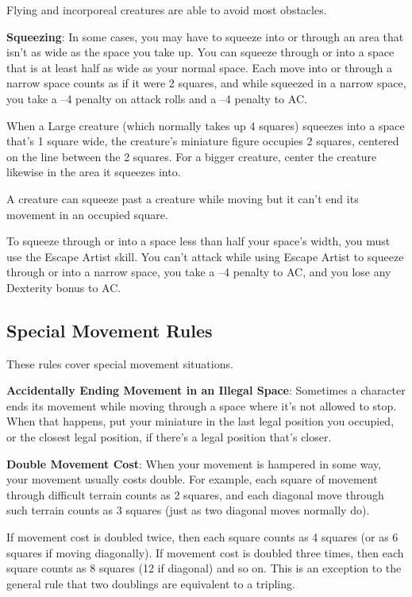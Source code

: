Flying and incorporeal creatures are able to avoid most obstacles.
				
\textbf{Squeezing}: In some cases, you may have to squeeze into or through an area that isn't as wide as the space you take up. You can squeeze through or into a space that is at least half as wide as your normal space. Each move into or through a narrow space counts as if it were 2 squares, and while squeezed in a narrow space, you take a --4 penalty on attack rolls and a --4 penalty to AC.
				
When a Large creature (which normally takes up 4 squares) squeezes into a space that's 1 square wide, the creature's miniature figure occupies 2 squares, centered on the line between the 2 squares. For a bigger creature, center the creature likewise in the area it squeezes into.
				
A creature can squeeze past a creature while moving but it can't end its movement in an occupied square.
				
To squeeze through or into a space less than half your space's width, you must use the Escape Artist skill. You can't attack while using Escape Artist to squeeze through or into a narrow space, you take a --4 penalty to AC, and you lose any Dexterity bonus to AC.
				
\subsection{Special Movement Rules}

				
These rules cover special movement situations.
				
\textbf{Accidentally Ending Movement in an Illegal Space}: Sometimes a character ends its movement while moving through a space where it's not allowed to stop. When that happens, put your miniature in the last legal position you occupied, or the closest legal position, if there's a legal position that's closer.
				
\textbf{Double Movement Cost}: When your movement is hampered in some way, your movement usually costs double. For example, each square of movement through difficult terrain counts as 2 squares, and each diagonal move through such terrain counts as 3 squares (just as two diagonal moves normally do).
				
If movement cost is doubled twice, then each square counts as 4 squares (or as 6 squares if moving diagonally). If movement cost is doubled three times, then each square counts as 8 squares (12 if diagonal) and so on. This is an exception to the general rule that two doublings are equivalent to a tripling.
				
